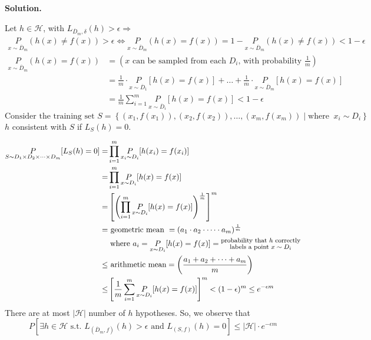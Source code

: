 \documentclass{article}
\newcommand{\<}{\langle}
\renewcommand{\>}{\rangle}
\theoremstyle{definition}
\def\gH{{\mathcal{H}}}
\newcommand{\uset}{\underset}
\newcommand{\uset}{\underset}
\begin{document}
\textbf{Solution.}

Let $h \in \gH$, with $L_{\overline{D}_{m}, \delta}(h) > \epsilon \Rightarrow$
\begin{align*}
  \uset{x \sim \overline{D}_m}{P}(h(x) \neq f(x)) > \epsilon \Leftrightarrow
  \uset{x \sim \overline{D}_m}{P}(h(x) = f(x)) =
    1 - \uset{x \sim \overline{D}_m}{P}(h(x) \neq f(x)) < 1 - \epsilon
\end{align*}
\begin{align*}
  \uset{x \sim \overline{D}_m}{P}(h(x)=f(x)) 
    &= \left(\text{$x$ can be sampled from each $D_i$, with probability $\frac{1}{m}$}\right) \\
    &= \frac{1}{m} \cdot \uset{x \sim \overline{D}_1}{P}[h(x) = f(x)] + \dots +
       \frac{1}{m} \cdot \uset{x \sim \overline{D}_m}{P}[h(x) = f(x)] \\
    &= \frac{1}{m} \sum_{i = 1}^m \uset{x \sim \overline{D}_i}{P}[h(x) = f(x)] < 1 - \epsilon
\end{align*}
\begin{equation*}
\text{Consider the training set } S = \left\lbrace (x_1, f(x_1)), (x_2, f(x_2)), \dots, (x_m, f(x_m)) \mid
                   \text{where }\ x_i \sim D_i \right\rbrace
\end{equation*}
$h$ consistent with $S$ if $L_S(h) = 0$.

\begin{align*}
  \uset{S \sim D_1 \times D_2 \times \dots \times D_m}{P}[L_S(h) = 0]
    =& \prod_{i = 1}^m \uset{x_i \sim D_i}{P}[h(x_i) = f(x_i)] \\
    =& \prod_{i = 1}^m \uset{x \sim D_i}{P}[h(x) = f(x)] \\
    =& \left[\left(\prod_{i = 1}^m \uset{x \sim D_i}{P}[h(x) = f(x)] \right)^{\frac{1}{m}}\right]^m \\
    =& \text{ geometric mean } = (a_1 \cdot a_2 \cdot \dots \cdot a_m)^{\frac{1}{m}} \\
     & \;\text{where } a_i = \uset{x \sim D_i}{P}[h(x) = f(x)] =
       \substack{\text{\footnotesize probability that $h$ correctly} \\
                 \text{\footnotesize labels a point $x \sim D_i$}} \\
 \leq& \text{ arithmetic mean} = \left( \frac{a_1 + a_2 + \dots + a_m}{m} \right) \\
 \leq& \left[\frac{1}{m} \sum_{i = 1}^m \uset{x \sim D_i}{P}[h(x) = f(x)]\right]^m
    <  (1 - \epsilon)^m \leq e^{-\epsilon m}
\end{align*}
There are at most $|\gH|$ number of $h$ hypotheses. So, we observe that
\begin{equation*}
  P\left[ \exists h \in \gH \text{ s.t. } L_{(\overline{D}_m, f)}(h) > \epsilon \text{ and } L_{(S, f)}(h) = 0 \right]
  \leq |\gH| \cdot e^{-\epsilon m}
\end{equation*}
\end{document}
